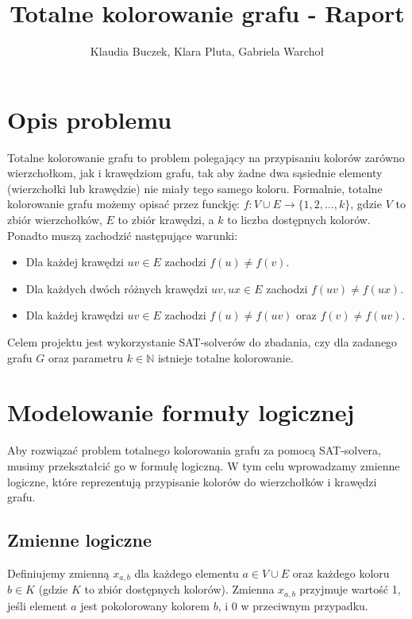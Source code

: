 \documentclass[11pt,a4paper]{article}
\title{Totalne kolorowanie grafu - Raport}
\author{Klaudia Buczek, Klara Pluta, Gabriela Warchoł}
\date{}
\theoremstyle{definition}
\begin{document}
\maketitle

\section{Opis problemu}
Totalne kolorowanie grafu to problem polegający na przypisaniu kolorów zarówno wierzchołkom, jak i krawędziom grafu, tak aby żadne dwa sąsiednie elementy (wierzchołki lub krawędzie) nie miały tego samego koloru. Formalnie, totalne kolorowanie grafu możemy opisać przez funckję: $f: V \cup E \to \{1, 2, \ldots, k\}$, gdzie $V$ to zbiór wierzchołków, $E$ to zbiór krawędzi, a $k$ to liczba dostępnych kolorów. Ponadto muszą zachodzić następujące warunki:
\begin{itemize}
  \item Dla każdej krawędzi $uv \in E$ zachodzi $f(u) \neq f(v)$.
  \item Dla każdych dwóch różnych krawędzi $uv, ux \in E$ zachodzi $f(uv)\neq f(ux)$.
  \item Dla każdej krawędzi $uv \in E$ zachodzi $f(u) \neq f(uv)$ oraz $f(v) \neq f(uv)$.
\end{itemize}
Celem projektu jest wykorzystanie SAT-solverów do zbadania, czy dla zadanego grafu $G$ oraz parametru $k\in \mathbb{N}$ istnieje totalne kolorowanie.

\section{Modelowanie formuły logicznej}
Aby rozwiązać problem totalnego kolorowania grafu za pomocą SAT-solvera, musimy przekształcić go w formułę logiczną. W tym celu wprowadzamy zmienne logiczne, które reprezentują przypisanie kolorów do wierzchołków i krawędzi grafu.

\subsection{Zmienne logiczne}
Definiujemy zmienną $x_{a,b}$ dla każdego elementu $a \in V \cup E$ oraz każdego koloru $b \in K$ (gdzie $K$ to zbiór dostępnych kolorów). Zmienna $x_{a,b}$ przyjmuje wartość 1, jeśli element $a$ jest pokolorowany kolorem $b$, i 0 w przeciwnym przypadku.
\end{document}
